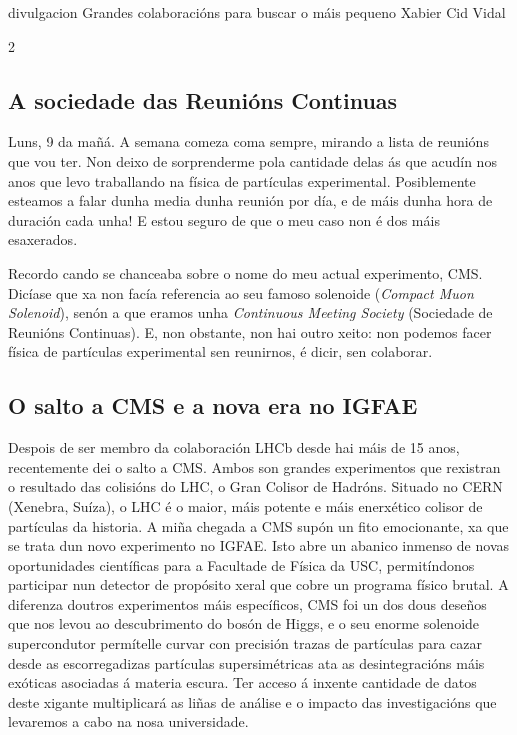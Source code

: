\Artigo%
{divulgacion}%
{Grandes colaboracións para buscar o máis pequeno}%
{Xabier Cid Vidal}%
{}%

\begin{multicols}{2}

\subsection*{A sociedade das Reunións Continuas}
Luns, 9 da mañá. A semana comeza coma sempre, mirando a lista de reunións que
vou ter. Non deixo de sorprenderme pola cantidade delas ás que acudín nos anos
que levo traballando na física de partículas experimental. Posiblemente
esteamos a falar dunha media dunha reunión por día, e de máis dunha hora de
duración cada unha! E estou seguro de que o meu caso non é dos máis esaxerados.

Recordo cando se chanceaba sobre o
nome do meu actual experimento, CMS. Dicíase que xa non facía referencia ao seu famoso solenoide
(\textit{Compact Muon Solenoid}), senón a que eramos unha \textit{Continuous
Meeting Society} (Sociedade de Reunións Continuas). E, non obstante, non hai
outro xeito: non podemos facer física de partículas experimental sen reunirnos,
é dicir, sen colaborar.

\subsection*{O salto a CMS e a nova era no IGFAE}

Despois de ser membro da colaboración LHCb desde hai máis de 15 anos,
recentemente dei o salto a CMS. Ambos son grandes experimentos que rexistran o
resultado das colisións do LHC, o Gran Colisor de Hadróns. Situado no CERN
(Xenebra, Suíza), o LHC é o maior, máis potente e máis enerxético colisor de
partículas da historia. A miña chegada a CMS supón un fito emocionante, xa que
se trata dun novo experimento no IGFAE. Isto abre un abanico inmenso de novas
oportunidades científicas para a Facultade de Física da USC, permitíndonos
participar nun detector de propósito xeral que cobre un programa físico brutal.
A diferenza doutros experimentos máis específicos, CMS foi un dos dous deseños
que nos levou ao descubrimento do bosón de Higgs, e o seu enorme solenoide
supercondutor permítelle curvar con precisión trazas de partículas para cazar
desde as escorregadizas partículas supersimétricas ata as desintegracións máis
exóticas asociadas á materia escura. Ter acceso á inxente cantidade de datos
deste xigante multiplicará as liñas de análise e o impacto das investigacións
que levaremos a cabo na nosa universidade.



\end{multicols}
